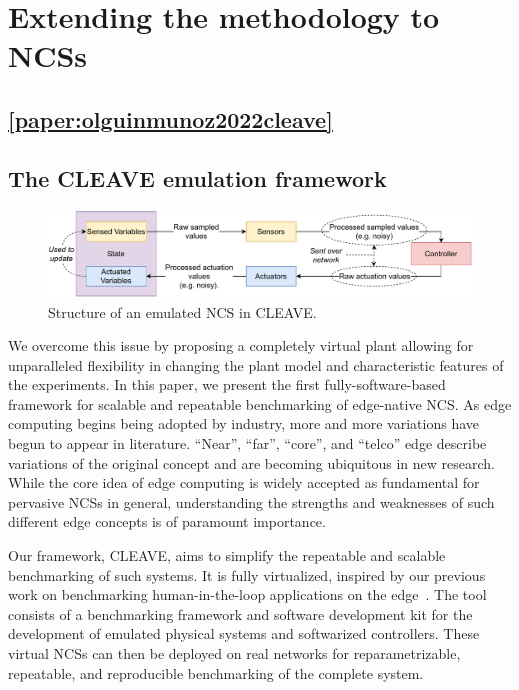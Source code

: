 \FloatBarrier%
\section{Extending the methodology to \acsp{NCS}}

\subsection{\cref{paper:olguinmunoz2022cleave}}\label{summary:2022cleave}

\subsection{The CLEAVE emulation framework}

\begin{figure}
    \centering
    \includegraphics[width=.8\textwidth]{publications/2022CLEAVE/images/CLEAVE_NCS_structure}
    \caption{
        Structure of an emulated \acl*{NCS} in \acs*{CLEAVE}.
    }\label{fig:cleave:ncs:struct}
\end{figure}

We overcome this issue by proposing a completely virtual plant allowing for unparalleled flexibility in changing the plant model and characteristic features of the experiments.
In this paper, we present the first fully-software-based framework for scalable and repeatable benchmarking of edge-native \ac{NCS}.
As edge computing begins being adopted by industry, more and more variations have begun to appear in literature.
``Near'', ``far'', ``core'', and ``telco'' edge describe variations of the original concept and are becoming ubiquitous in new research.
While the core idea of edge computing is widely accepted as fundamental for pervasive \acp{NCS} in general, understanding the strengths and weaknesses of such different edge concepts is of paramount importance.

Our framework, \ac{CLEAVE}, aims to simplify the repeatable and scalable benchmarking of such systems.
It is fully virtualized, inspired by our previous work on benchmarking human-in-the-loop applications on the edge~\cite{Olguin2019EdgeDroid}.
The tool consists of a benchmarking framework and software development kit for the development of emulated physical systems and softwarized controllers.
These virtual \acp{NCS} can then be deployed on real networks for reparametrizable, repeatable, and reproducible benchmarking of the complete system.

